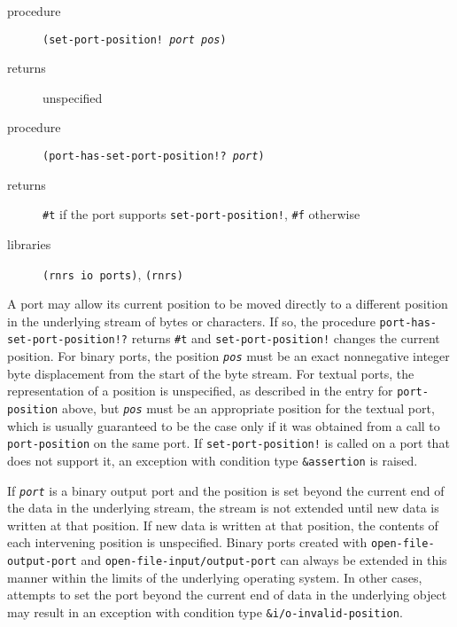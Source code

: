 \begin{description}

\label{io_s50}\item[procedure] \texttt{(set-port-position! \textit{port} \textit{pos})}



\item[returns] unspecified


\item[procedure] \texttt{(port-has-set-port-position!? \textit{port})}



\item[returns] \texttt{\#{}t} if the port supports \texttt{set-port-position!}, \texttt{\#{}f} otherwise


\item[libraries] \texttt{(rnrs io ports)}, \texttt{(rnrs)}
\end{description}


A port may allow its current position to be moved directly to a different
position in the underlying stream of bytes or characters.
If so, the procedure \texttt{port-has-set-port-position!?} returns
\texttt{\#{}t} and \texttt{set-port-position!} changes the current position.
For binary ports, the position \texttt{\textit{pos}} must be an exact nonnegative integer byte
displacement from the start of the byte stream.
For textual ports, the representation of a position is unspecified, as
described in the entry for \texttt{port-position} above, but \texttt{\textit{pos}} must be
an appropriate position for the textual port, which is usually guaranteed
to be the case only if it was obtained from a call to \texttt{port-position}
on the same port.
If \texttt{set-port-position!} is called on a port that does not support it,
an exception with condition type \texttt{\&{}assertion} is raised.


If \texttt{\textit{port}} is a binary output port and the position is set
beyond the current end of the data in the underlying stream, the
stream is not extended until new data is written at that position.
If new data is written at that position, the contents of each
intervening position is unspecified.
Binary ports created with \texttt{open-file-output-port} and
\texttt{open-file-input/output-port} can always be extended in this manner
within the limits of the underlying operating system.
In other cases, attempts to set the port beyond the current end of data
in the underlying object may result in an exception with condition
type \texttt{\&{}i/o-invalid-position}.


